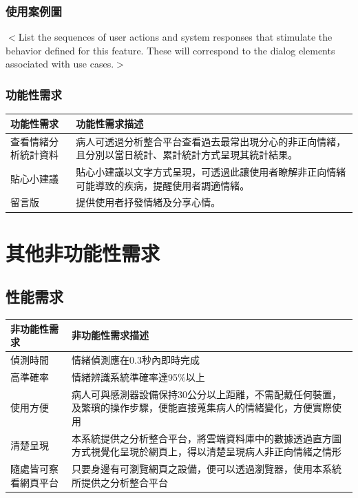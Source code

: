 \documentclass[12pt]{scrreprt}
\begin{document}
\subsection{使用案例圖}
$<$List the sequences of user actions and system responses that stimulate the 
behavior defined for this feature. These will correspond to the dialog elements 
associated with use cases.$>$

\subsection{功能性需求}
\begin{center}  
\begin{tabular}{|l| p{10cm}|}  
\hline  
功能性需求 & 功能性需求描述   \\ \hline  
查看情緒分析統計資料 &病人可透過分析整合平台查看過去最常出現分心的非正向情緒，且分別以當日統計、累計統計方式呈現其統計結果。    \\ \hline  
貼心小建議 &貼心小建議以文字方式呈現，可透過此讓使用者瞭解非正向情緒可能導致的疾病，提醒使用者調適情緒。    \\ \hline
留言版 &提供使用者抒發情緒及分享心情。    \\ \hline

\end{tabular}  
\end{center}  


\chapter{其他非功能性需求}

\section{性能需求}

\begin{center}  
\begin{tabular}{|l| p{10cm}|}  
\hline  
非功能性需求 & 非功能性需求描述   \\ \hline  
偵測時間 & 情緒偵測應在0.3秒內即時完成    \\ \hline  
高準確率 & 情緒辨識系統準確率達95\%以上 \\ \hline
使用方便 &病人可與感測器設備保持30公分以上距離，不需配戴任何裝置，及繁瑣的操作步驟，便能直接蒐集病人的情緒變化，方便實際使用 \\ \hline
清楚呈現 & 本系統提供之分析整合平台，將雲端資料庫中的數據透過直方圖方式視覺化呈現於網頁上，得以清楚呈現病人非正向情緒之情形 \\ \hline
隨處皆可察看網頁平台 & 只要身邊有可瀏覽網頁之設備，便可以透過瀏覽器，使用本系統所提供之分析整合平台 \\ \hline

\end{tabular}  
\end{center}  
\end{document}
